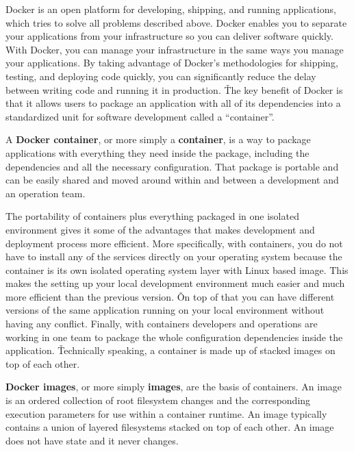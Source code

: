 Docker is an open platform for developing, shipping, and running applications, which tries to solve all problems
described above. Docker enables you to separate your applications from your infrastructure so you can deliver
software quickly. With Docker, you can manage your infrastructure in the same ways you manage your applications. By
taking advantage of Docker's methodologies for shipping, testing, and deploying code quickly, you can significantly
reduce the delay between writing code and running it in production. \v

The key benefit of Docker is that it allows users to package an application with all of its dependencies into a
standardized unit for software development called a ``container''.

A \textbf{Docker container}, or more simply a \textbf{container}, is a way to package applications with everything
they need inside the package, including the dependencies and all the necessary configuration. That package is
portable and can be easily shared and moved around within and between a development and an operation team.
\ed

The portability of containers plus everything packaged in one isolated environment gives it some of the advantages
that makes development and deployment process more efficient. More specifically, with containers, you do not have to
install any of the services directly on your operating system because the container is its own isolated operating
system layer with Linux based image. This makes the setting up your local development environment much easier and
much more efficient than the previous version. \v

On top of that you can have different versions of the same application running on your local environment without
having any conflict. Finally, with containers developers and operations are working in one team to package the whole
configuration dependencies inside the application. \v

Technically speaking, a container is made up of stacked images on top of each other.

\textbf{Docker images}, or more simply \textbf{images}, are the basis of containers. An image is an ordered
collection of root filesystem changes and the corresponding execution parameters for use within a container runtime.
An image typically contains a union of layered filesystems stacked on top of each other. An image does not have state
and it never changes.
\ed

